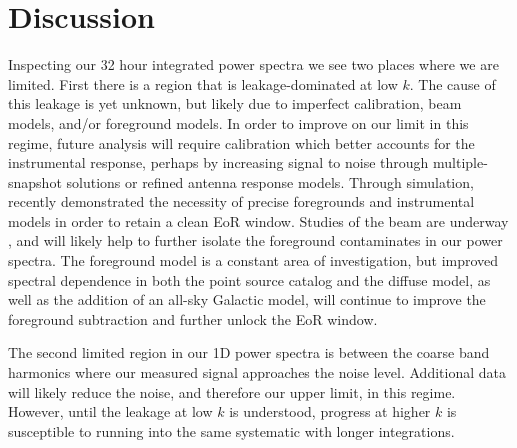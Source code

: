 \documentclass[iop]{emulateapj}
\begin{document}
\section{Discussion}\label{sec:discussion}
Inspecting our 32 hour integrated power spectra we see two places where we are limited. 
First there is a region that is leakage-dominated at low $k$. The cause of this leakage is yet 
unknown, but likely due to imperfect calibration, beam models, and/or foreground models.
In order to improve on our limit in this regime, future analysis will require calibration which 
better accounts for the instrumental response, perhaps by increasing signal to noise 
through multiple-snapshot solutions or refined antenna response models. 
Through simulation, \citealt{Thyagarajan:2016} recently demonstrated the necessity of
 precise foregrounds and instrumental models in order to retain a clean EoR window.
Studies of the 
beam are underway \citep[e.g.][]{Neben:2015, Sutinjo:2015}, and will likely help to further isolate the 
foreground contaminates in our power spectra. The foreground model is a constant area of 
investigation, but improved spectral dependence in both the point source catalog and the 
diffuse model, as well as the addition of an all-sky Galactic model, will continue to improve 
the foreground subtraction and further unlock the EoR window.

The second limited region in our 1D power spectra is between the coarse band harmonics 
where our measured signal approaches the noise level. Additional data will likely reduce the 
noise, and therefore our upper limit, in this regime. However, until the leakage at low $k$ is 
understood, progress at higher $k$ is susceptible to running into the same systematic
with longer integrations. 
\end{document}
